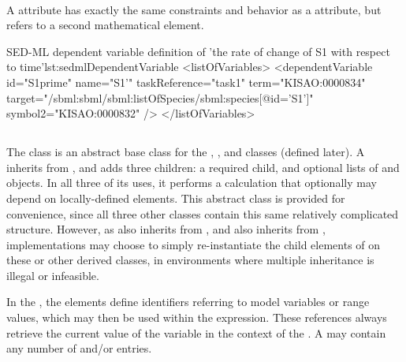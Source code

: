 \begin{blockChanged}
\paragraph*{}
\label{sec:symbol2}
A  attribute has exactly the same constraints and behavior as a  attribute, but refers to a second mathematical element.


\begin{myXmlLst}{SED-ML dependent variable definition of 'the rate of change of S1 with respect to time'}{lst:sedmlDependentVariable}
<listOfVariables>
	<dependentVariable id="S1prime" name="S1'"  taskReference="task1"
		term="KISAO:0000834"
		target="/sbml:sbml/sbml:listOfSpecies/sbml:species[@id='S1']"
		symbol2="KISAO:0000832" />
</listOfVariables>
\end{myXmlLst}


\subsection{}
\label{class:calculation}
\label{class:listOfVariables}
\label{class:listOfParameters}

The \Calculation class is an abstract base class for the \ComputeChange, \DataGenerator, and \FunctionalRange classes (defined later).  A \Calculation inherits from \SedBase, and adds three children:  a required \Math child, and optional lists of \Variable and \Parameter objects.  In all three of its uses, it performs a calculation that optionally may depend on locally-defined elements.  This abstract class is provided for convenience, since all three other classes contain this same relatively complicated structure.  However, as \FunctionalRange also inherits from \Range, and \ComputeChange also inherits from \Change, implementations may choose to simply re-instantiate the child elements of \Calculation on these or other derived classes, in environments where multiple inheritance is illegal or infeasible.


In the \ListOfVariables, the \Variable elements define identifiers referring to model variables or range values, which may then be used within the \Math expression. These references always retrieve the current value of the variable in the context of the \Calculation.  A \ListOfVariables may contain any number of \Variable and/or \DependentVariable entries.


\end{blockChanged}
